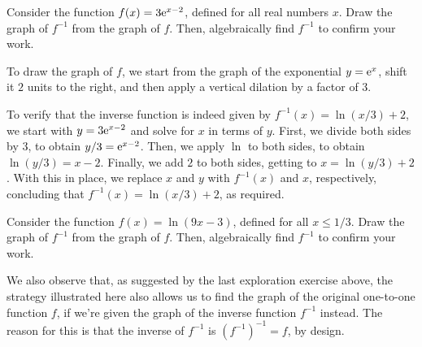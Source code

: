 \documentclass[nooutcomes]{ximera}
\begin{document}
\begin{example}
  Consider the function $f(x) = 3{\rm e}^{x-2}$, defined for all real numbers $x$. Draw the graph of $f^{-1}$ from the graph of $f$. Then, algebraically find $f^{-1}$ to confirm your work.
  
  \begin{explanation}
    To draw the graph of $f$, we start from the graph of the exponential $y={\rm e}^x$, shift it $2$ units to the right, and then apply a vertical dilation by a factor of $3$.

    \begin{image}
    \end{image}

  To verify that the inverse function is indeed given by $f^{-1}(x) = \ln(x/3)+2$, we start with $y=3{\rm e}^{x-2}$ and solve for $x$ in terms of $y$. First, we divide both sides by $3$, to obtain $y/3 = {\rm e}^{x-2}$. Then, we apply $\ln$ to both sides, to obtain $\ln (y/3) = x-2$. Finally, we add $2$ to both sides, getting to $x = \ln(y/3)+2$. With this in place, we replace $x$ and $y$ with $f^{-1}(x)$ and $x$, respectively, concluding that $f^{-1}(x) = \ln(x/3)+2$, as required.    
  \end{explanation}
\end{example}

\begin{exploration}
  Consider the function $f(x) = \ln(9x-3)$, defined for all $x\leq 1/3$. Draw the graph of $f^{-1}$ from the graph of $f$. Then, algebraically find $f^{-1}$ to confirm your work.
\end{exploration}

We also observe that, as suggested by the last exploration exercise above, the strategy illustrated here also allows us to find the graph of the original one-to-one function $f$, if we're given the graph of the inverse function $f^{-1}$ instead. The reason for this is that the inverse of $f^{-1}$ is $(f^{-1})^{-1} = f$, by design.
\end{document}

